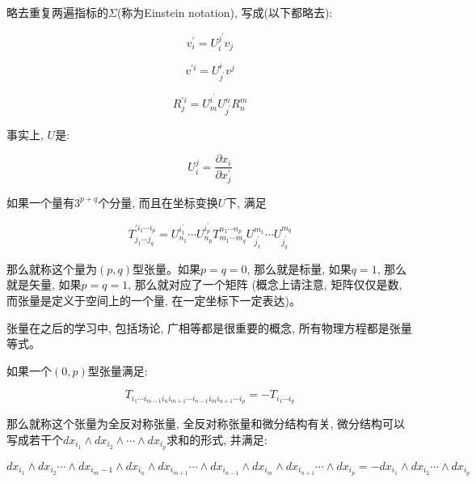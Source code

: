 \documentclass{ctexart}
\numberwithin{equation}{subsection}
\numberwithin{theorem}{subsection}
\numberwithin{definition}{subsection}
\numberwithin{proof}{subsection}
\numberwithin{lemma}{subsection}
\numberwithin{example}{subsection}
\numberwithin{remark}{subsection}
\numberwithin{corollary}{subsection}
\numberwithin{exercise}{subsection}
\numberwithin{problem}{subsection}
\numberwithin{question}{section}
\numberwithin{method}{subsection}
\begin{document}
    略去重复两遍指标的$\Sigma$(称为Einstein notation), 写成(以下都略去):

    \begin{equation}
        v^\prime_i = U^{j^\prime}_i v_j
    \end{equation}

    \begin{equation}
        v^{\prime i} = U^i_{j^\prime} v^j
    \end{equation}

    \begin{equation}
        R^{\prime i}_j = U^{i^\prime}_m U^n_{j^\prime} R^m_n
    \end{equation}

    事实上, $U$是:

    \begin{equation}
        U^j_i = \frac{\partial x_i}{\partial x_j^\prime}
    \end{equation}

    如果一个量有$3^{p+q}$个分量, 而且在坐标变换$U$下, 满足

    \begin{equation}
        T^{\prime i_1 \cdots i_p}_{j_1 \cdots j_q} = U^{i_1^\prime}_{n_1} \cdots U^{i_p^\prime}_{n_p} T^{n_1 \cdots n_p}_{m_1 \cdots m_q} U^{m_1}_{j_1^\prime} \cdots U^{m_q}_{j_q^\prime}
    \end{equation}

    那么就称这个量为$(p,q)$型张量。如果$p=q=0$, 那么就是标量, 如果$q=1$, 那么就是矢量, 如果$p=q=1$, 那么就对应了一个矩阵
    (概念上请注意, 矩阵仅仅是数, 而张量是定义于空间上的一个量, 在一定坐标下一定表达)。

    张量在之后的学习中, 包括场论, 广相等都是很重要的概念, 所有物理方程都是张量等式。

    如果一个$(0,p)$型张量满足:

    \begin{equation}
        T_{i_1 \cdots i_{m-1} i_n i_{m+1} \cdots i_{n-1} i_m i_{n+1} \cdots i_p} = 
        - T_{i_1 \cdots i_p}
    \end{equation}

    那么就称这个张量为全反对称张量, 全反对称张量和微分结构有关, 
    微分结构可以写成若干个$dx_{i_1} \wedge dx_{i_2} \wedge \cdots \wedge dx_{i_p}$求和的形式, 并满足:

    \begin{equation}
        dx_{i_1} \wedge dx_{i_2} \cdots \wedge dx_{i_m-1} \wedge dx_{i_n} \wedge dx_{i_{m+1}} \cdots \wedge dx_{i_{n-1}} \wedge dx_{i_m} \wedge dx_{i_{n+1}} \cdots \wedge dx_{i_p} = 
        - dx_{i_1} \wedge dx_{i_2} \cdots \wedge dx_{i_p}
    \end{equation}
\end{document}
